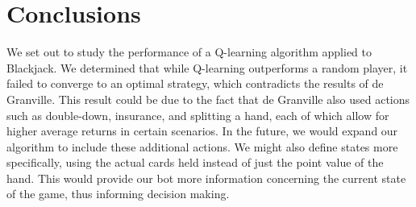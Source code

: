 
\section{Conclusions}
\label{sec:concl}
We set out to study the performance of a Q-learning algorithm applied to Blackjack. We determined that while Q-learning outperforms a random player, it failed to converge to an optimal strategy, which contradicts the results of de Granville. This result could be due to the fact that de Granville also used actions such as double-down, insurance, and splitting a hand, each of which allow for higher average returns in certain scenarios. In the future, we would expand our algorithm to include these additional actions. We might also define states more specifically, using the actual cards held instead of just the point value of the hand. This would provide our bot more information concerning the current state of the game, thus informing decision making. 


